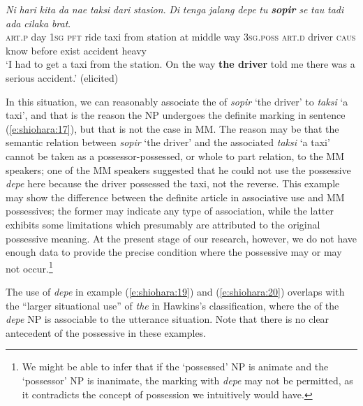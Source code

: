 \documentclass[output=paper
,modfonts
,nonflat]{langsci/langscibook}
\begin{document}
\begin{exe}
	\ex\label{e:shiohara:18}
	\gll \textit{Ni} \textit{hari} \textit{kita} \textit{da} \textit{nae} \textit{taksi} \textit{dari} \textit{stasion}. \textit{Di} \textit{tenga} \textit{jalang} {\USOParen}{\USStar}\textit{depe} {\USSlash} {\USStar}\textit{tu}{\USCParen} \textbf{\textit{sopir}} \textit{se} \textit{tau} \textit{tadi} \textit{ada} \textit{cilaka} \textit{brat}.\\
	\textsc{art.p} day \textsc{1sg} \textsc{pft} ride taxi from station at middle way  \phantom{(*}\textsc{3sg.poss} { } \phantom{*}\textsc{art.d} driver \textsc{caus} know before exist accident heavy\\
	\glt ‘I had to get a taxi from the station. On the way \textbf{the driver} told me there was a serious accident.’ \hfill{(elicited)}
\end{exe}

\noindent
In this situation, we can reasonably associate the  of \textit{sopir} ‘the driver’ to \textit{taksi} ‘a taxi’, and that is the reason the NP undergoes the definite marking in  sentence (\ref{e:shiohara:17}), but that is not the case in MM. The reason may be that the semantic relation between \textit{sopir} ‘the driver’ and the associated \textit{taksi} ‘a taxi’ cannot be taken as a possessor-possessed, or whole to part relation, to the MM speakers; one of the MM speakers suggested that he could not use the possessive \textit{depe} here because the driver possessed the taxi, not the reverse. This example may show the difference between the  definite article in associative use and MM possessives; the former may indicate any type of association, while the latter exhibits some limitations which presumably are attributed to the original possessive meaning. At the present stage of our research, however, we do not have enough data to provide the precise condition where the possessive may or may not occur.\footnote{We might be able to infer that if the ‘possessed’ NP is animate and the ‘possessor’ NP is inanimate, the marking with \textit{depe} may not be permitted, as it contradicts the concept of possession we intuitively would have.}

The use of \textit{depe} in example (\ref{e:shiohara:19}) and (\ref{e:shiohara:20}) overlaps with the “larger situational use” of \textit{the} in Hawkins’s classification, where the  of the \textit{depe} NP is associable to the utterance situation. Note that there is no clear antecedent of the possessive in these examples.
\end{document}
